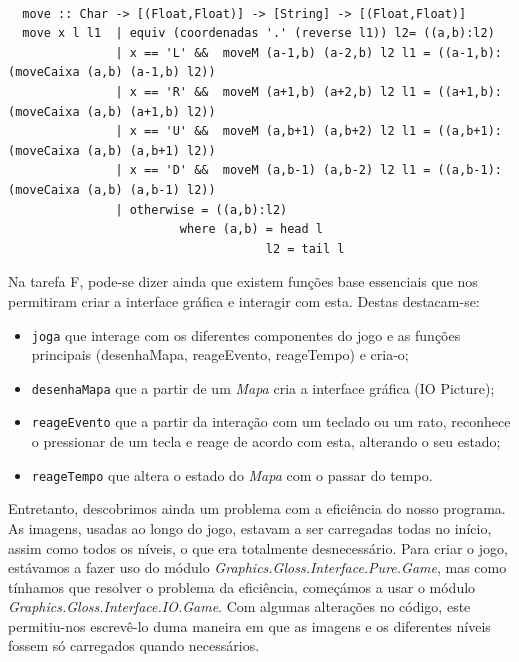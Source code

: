 \documentclass[a4paper]{article}
\begin{document}
\newpage
{\footnotesize
\begin{Verbatim}

  move :: Char -> [(Float,Float)] -> [String] -> [(Float,Float)]
  move x l l1  | equiv (coordenadas '.' (reverse l1)) l2= ((a,b):l2) 
               | x == 'L' &&  moveM (a-1,b) (a-2,b) l2 l1 = ((a-1,b):(moveCaixa (a,b) (a-1,b) l2)) 
               | x == 'R' &&  moveM (a+1,b) (a+2,b) l2 l1 = ((a+1,b):(moveCaixa (a,b) (a+1,b) l2)) 
               | x == 'U' &&  moveM (a,b+1) (a,b+2) l2 l1 = ((a,b+1):(moveCaixa (a,b) (a,b+1) l2))
               | x == 'D' &&  moveM (a,b-1) (a,b-2) l2 l1 = ((a,b-1):(moveCaixa (a,b) (a,b-1) l2))
               | otherwise = ((a,b):l2)
                        where (a,b) = head l
                                    l2 = tail l

\end{Verbatim}

}


Na tarefa F, pode-se dizer ainda que existem funções base essenciais que nos permitiram criar a interface gráfica e interagir com esta. Destas destacam-se:

\begin{itemize}
\item \texttt{joga} que interage com os diferentes componentes do jogo e as funções principais (desenhaMapa, reageEvento, reageTempo) e cria-o;
\item \texttt{desenhaMapa} que a partir de um \emph{Mapa} cria a interface gráfica (IO Picture);
\item \texttt{reageEvento} que a partir da interação com um teclado ou um rato, reconhece o pressionar de um tecla e reage de acordo com esta, alterando o seu estado;
\item \texttt{reageTempo} que altera o estado do \emph{Mapa} com o passar do tempo.
\end{itemize}

Entretanto, descobrimos ainda um problema com a eficiência do nosso programa. As imagens, usadas ao longo do jogo, estavam a ser carregadas todas no início, assim como todos os níveis, o que era totalmente desnecessário. Para criar o jogo, estávamos a fazer uso do módulo \emph{Graphics.Gloss.Interface.Pure.Game}, mas como tínhamos que resolver o problema da eficiência, começámos a usar o módulo \emph{Graphics.Gloss.Interface.IO.Game}. Com algumas alterações no código, este permitiu-nos escrevê-lo duma maneira em que as imagens e os diferentes níveis fossem só carregados quando necessários.
\end{document}
